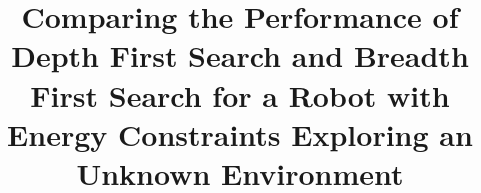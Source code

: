 \documentclass[conference]{IEEEtran}
\begin{document}
%
\title{Comparing the Performance of Depth First Search and Breadth First Search for a Robot with Energy Constraints Exploring an Unknown Environment}


\author{
}


% 




\end{document}
